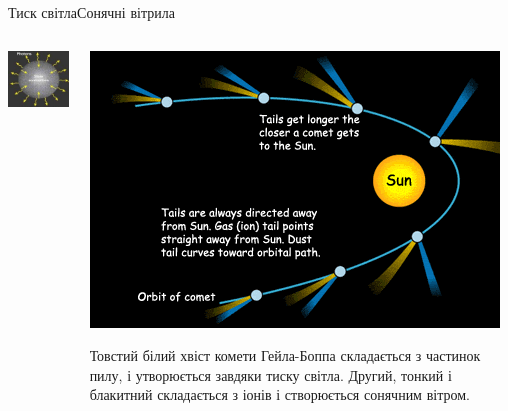 \documentclass{beamer}
\begin{document}
\begin{frame}{Тиск світла}{Сонячні вітрила}
\begin{onlyenv}
\begin{columns}
\begin{column}{0.5\linewidth}
				\includegraphics[width=\linewidth]{Star}
			\end{column}
			\begin{column}{0.5\linewidth}\centering
				\includegraphics[width=\linewidth]{Comet}

				\begin{block}{}\tiny
					Товстий білий хвіст комети Гейла-Боппа складається з частинок пилу, і утворюється завдяки тиску світла. Другий, тонкий і блакитний складається з іонів і створюється сонячним вітром.
				\end{block}
			\end{column}
		\end{columns}
	\end{onlyenv}
\end{frame}
\end{document}
